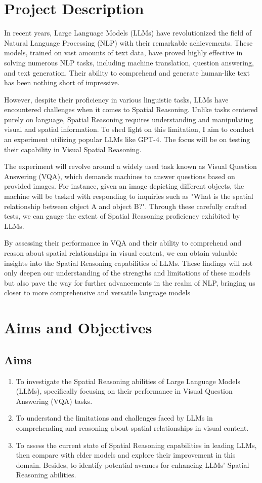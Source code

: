 \documentclass[journal,10pt]{IEEEtran}
\begin{document}

\section{Project Description}

In recent years, Large Language Models (LLMs) have revolutionized the field of Natural Language Processing (NLP) with their remarkable achievements. These models, trained on vast amounts of text data, have proved highly effective in solving numerous NLP tasks, including machine translation, question answering, and text generation. Their ability to comprehend and generate human-like text has been nothing short of impressive.

However, despite their proficiency in various linguistic tasks, LLMs have encountered challenges when it comes to Spatial Reasoning. Unlike tasks centered purely on language, Spatial Reasoning requires understanding and manipulating visual and spatial information. To shed light on this limitation, I aim to conduct an experiment utilizing popular LLMs like GPT-4. The focus will be on testing their capability in Visual Spatial Reasoning.

The experiment will revolve around a widely used task known as Visual Question Answering (VQA), which demands machines to answer questions based on provided images. For instance, given an image depicting different objects, the machine will be tasked with responding to inquiries such as "What is the spatial relationship between object A and object B?". Through these carefully crafted tests, we can gauge the extent of Spatial Reasoning proficiency exhibited by LLMs.

By assessing their performance in VQA and their ability to comprehend and reason about spatial relationships in visual content, we can obtain valuable insights into the Spatial Reasoning capabilities of LLMs. These findings will not only deepen our understanding of the strengths and limitations of these models but also pave the way for further advancements in the realm of NLP, bringing us closer to more comprehensive and versatile language models

\section{Aims and Objectives}
\subsection{Aims}
\begin{enumerate}
    \item To investigate the Spatial Reasoning abilities of Large Language Models (LLMs), specifically focusing on their performance in Visual Question Answering (VQA) tasks.
    \item To understand the limitations and challenges faced by LLMs in comprehending and reasoning about spatial relationships in visual content.
    \item To assess the current state of Spatial Reasoning capabilities in leading LLMs, then compare with elder models and explore their improvement in this domain. Besides, to identify potential avenues for enhancing LLMs' Spatial Reasoning abilities.
\end{enumerate}
\end{document}
